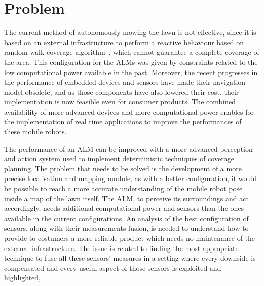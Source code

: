 \section{Problem}

\noindent 
The current method of autonomously mowing the lawn is not effective, since it is based on an external infrastructure to perform a reactive behaviour based on random walk coverage algorithm~\cite{karol_ardic_conditional_2016}, which cannot guarantee a complete coverage of the area.
This configuration for the \gls{ALM}s was given by constraints related to the low computational power available in the past.
Moreover, the recent progresses in the performance of embedded devices and sensors have made their navigation model obsolete, and as those components have also lowered their cost, their implementation is now feasible even for consumer products. 
The combined availability of more advanced devices and more computational power enables for the implementation of real time applications to improve the performances of these mobile robots. 


The performance of an \gls{ALM} can be improved with a more advanced perception and action system used to implement deterministic techniques of coverage planning.
The problem that needs to be solved is the development of a more precise localisation and mapping module, as with a better configuration, it would be possible to reach a more accurate understanding of the mobile robot pose inside a map of the lawn itself.
The \gls{ALM}, to perceive its surroundings and act accordingly, needs additional computational power  and sensors than the ones available in the current configurations.
An analysis of the best configuration of sensors, along with their measurements fusion, is needed to understand how to provide to costumers a more reliable product which needs no maintenance of the external infrastructure.
The issue is related to finding the most appropriate technique to fuse all these sensors' measures in a setting where every downside is compensated and every useful aspect of those sensors is exploited and highlighted,


